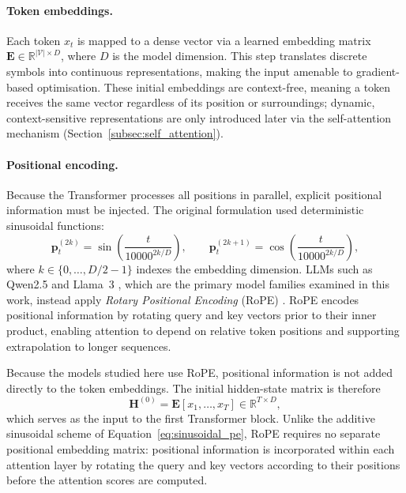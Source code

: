 \paragraph{Token embeddings.}
Each token $x_t$ is mapped to a dense vector via a learned embedding matrix
$\mathbf{E} \in \mathbb{R}^{|\mathcal{V}| \times D}$, where $D$ is the model dimension. This step translates discrete symbols into continuous representations, making the input amenable to gradient-based optimisation. These initial embeddings are context-free, meaning a token receives the same vector regardless of its position or surroundings; dynamic, context-sensitive representations are only introduced later via the self-attention mechanism (Section~\ref{subsec:self_attention}).

\paragraph{Positional encoding.}
Because the Transformer processes all positions in parallel, explicit positional
information must be injected. The original formulation \citep{vaswani2017attention}
used deterministic sinusoidal functions:
\begin{equation}
    \mathbf{p}_t^{(2k)} = \sin\!\left(\frac{t}{10000^{2k/D}}\right), \qquad
    \mathbf{p}_t^{(2k+1)} = \cos\!\left(\frac{t}{10000^{2k/D}}\right),
    \label{eq:sinusoidal_pe}
\end{equation}
where $k \in \{0, \ldots, D/2-1\}$ indexes the embedding dimension. LLMs such as Qwen2.5 \citep{qwen2025qwen25} and Llama~3 \citep{grattafiori2024llama3}, which are the primary model families examined in this work, instead apply \emph{Rotary Positional Encoding} (RoPE) \citep{su2024roformer}. RoPE encodes positional information by rotating query and key vectors prior to their inner product, enabling attention to depend on relative token positions and supporting extrapolation to longer sequences.

Because the models studied here use RoPE, positional information is not added directly to the token embeddings. The initial hidden-state matrix is therefore
\begin{equation}
    \mathbf{H}^{(0)} = \mathbf{E}[x_1, \ldots, x_T] \in \mathbb{R}^{T \times D},
    \label{eq:initial_hidden}
\end{equation}
which serves as the input to the first Transformer block. Unlike the additive sinusoidal scheme of Equation~\eqref{eq:sinusoidal_pe}, RoPE requires no separate positional embedding matrix: positional information is incorporated within each attention layer by rotating the query and key vectors according to their positions before the attention scores are computed.

